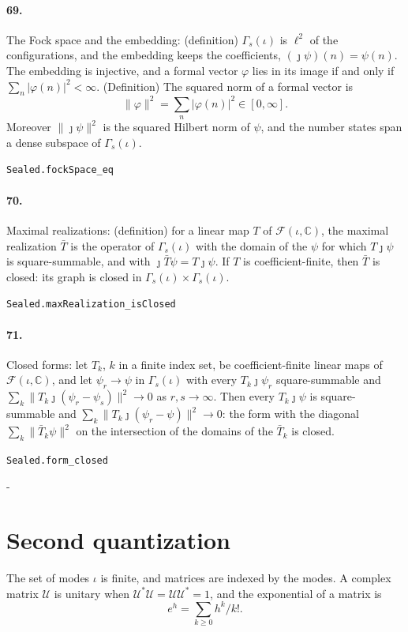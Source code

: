 \documentclass[11pt]{article}
\makeatletter
\newcommand{\keepspace}[1]{\par\penalty-100\begingroup\setlength{\dimen@}{#1}\dimen@ii\pagegoal\advance\dimen@ii-\pagetotal\ifdim\dimen@>\dimen@ii\ifdim\dimen@ii>\z@\vfil\fi\break\fi\endgroup}
\makeatother
\begin{document}
\paragraph{69.} The Fock space and the embedding: (definition) $\Gamma_s(\iota)$ is $\ell^2$ of the configurations, and the embedding keeps the coefficients, $(\jmath\psi)(n) = \psi(n)$. The embedding is injective, and a formal vector $\varphi$ lies in its image if and only if $\sum_n |\varphi(n)|^2 < \infty$. (Definition) The squared norm of a formal vector is \[\|\varphi\|^2 = \sum_n |\varphi(n)|^2 \in [0, \infty].\] Moreover $\|\jmath\psi\|^2$ is the squared Hilbert norm of $\psi$, and the number states span a dense subspace of $\Gamma_s(\iota)$.\par{\footnotesize\texttt{Sealed.fockSpace\_eq}}

\paragraph{70.} Maximal realizations: (definition) for a linear map $T$ of $\mathcal F(\iota, \mathbb C)$, the maximal realization $\bar T$ is the operator of $\Gamma_s(\iota)$ with the domain of the $\psi$ for which $T\jmath\psi$ is square-summable, and with $\jmath \bar T\psi = T\jmath\psi$. If $T$ is coefficient-finite, then $\bar T$ is closed: its graph is closed in $\Gamma_s(\iota) \times \Gamma_s(\iota)$.\par{\footnotesize\texttt{Sealed.maxRealization\_isClosed}}

\paragraph{71.} Closed forms: let $T_k$, $k$ in a finite index set, be coefficient-finite linear maps of $\mathcal F(\iota, \mathbb C)$, and let $\psi_r \to \psi$ in $\Gamma_s(\iota)$ with every $T_k\jmath\psi_r$ square-summable and $\sum_k \|T_k\jmath(\psi_r - \psi_s)\|^2 \to 0$ as $r, s \to \infty$. Then every $T_k\jmath\psi$ is square-summable and $\sum_k \|T_k\jmath(\psi_r - \psi)\|^2 \to 0$: the form with the diagonal $\sum_k \|\bar T_k\psi\|^2$ on the intersection of the domains of the $\bar T_k$ is closed.\par{\footnotesize\texttt{Sealed.form\_closed}}

\keepspace{14\baselineskip}\section*{Second quantization}
The set of modes $\iota$ is finite, and matrices are indexed by the modes. A complex matrix $\mathcal U$ is unitary when $\mathcal U^* \mathcal U = \mathcal U \mathcal U^* = 1$, and the exponential of a matrix is \[e^h = \sum_{k \ge 0} h^k / k!.\]
\end{document}
